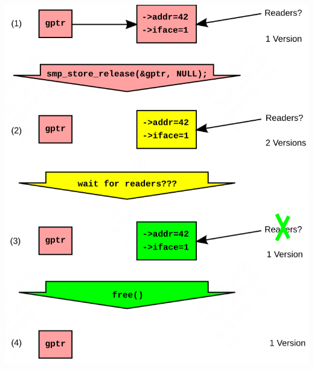 \documentclass[11pt]{article}
\begin{document}
\begin{center}
\includegraphics[width=.8\textwidth]{../images/perfbook/7.png}
\end{center}
\end{document}
